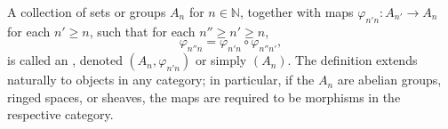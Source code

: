 A collection of sets or groups $A_n$ for $n \in \mathbb{N}$, together with maps $\varphi_{n'n}: A_{n'} \to A_n$ for each $n' \geq n$, such that for each $n'' \geq n' \geq n$,
$$\varphi_{n''n} = \varphi_{n'n} \circ \varphi_{n''n'},$$
is called an , denoted $(A_n, \varphi_{n'n})$ or simply $(A_n)$. The definition extends naturally to objects in any category; in particular, if the $A_n$ are abelian groups, ringed spaces, or sheaves, the maps are required to be morphisms in the respective category.
